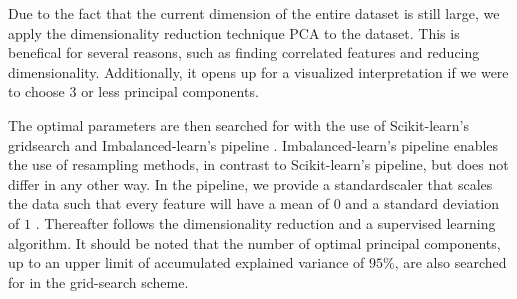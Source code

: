 

\noindent Due to the fact that the current dimension of the entire dataset is still large, we apply the dimensionality reduction technique PCA to the dataset. This is benefical for several reasons, such as finding correlated features and reducing dimensionality. Additionally, it opens up for a visualized interpretation if we were to choose $3$ or less principal components.

The optimal parameters are then searched for with the use of Scikit-learn's gridsearch \cite{Pedregosa2012} and Imbalanced-learn's pipeline \cite{Lemaitre2016}. Imbalanced-learn's pipeline enables the use of resampling methods, in contrast to Scikit-learn's pipeline, but does not differ in any other way. In the pipeline, we provide a standardscaler that scales the data such that every feature will have a mean of $0$ and a standard deviation of $1$ \cite{Pedregosa2012}. Thereafter follows the dimensionality reduction and a supervised learning algorithm. It should be noted that the number of optimal principal components, up to an upper limit of accumulated explained variance of $95\%$, are also searched for in the grid-search scheme.
